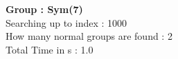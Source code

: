 \textbf{Group : Sym(7)}\\
Searching up to index : 1000\\
How many normal groups are found : 2\\
Total Time in s : 1.0\\
